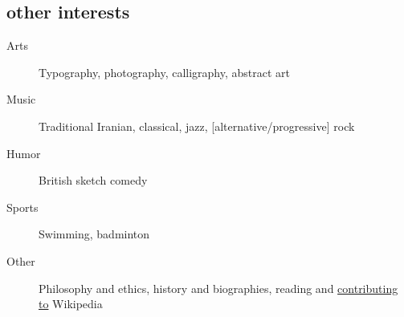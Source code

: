 \documentclass[overlapped,line,10pt,letterpaper]{res}
\begin{document}
\begin{resume}
\section{other interests}
\begin{description}
\item[Arts] Typography, photography, calligraphy, abstract art
\item[Music] Traditional Iranian, classical, jazz, [alternative/progressive] rock
\item[Humor] British sketch comedy
\item[Sports] Swimming, badminton
\item[Other] Philosophy and ethics, history and biographies, reading and \href{http://en.wikipedia.org/wiki/Special:Contributions/Hessammehr}{contributing to} Wikipedia
\end{description}
\end{resume}
\end{document}
